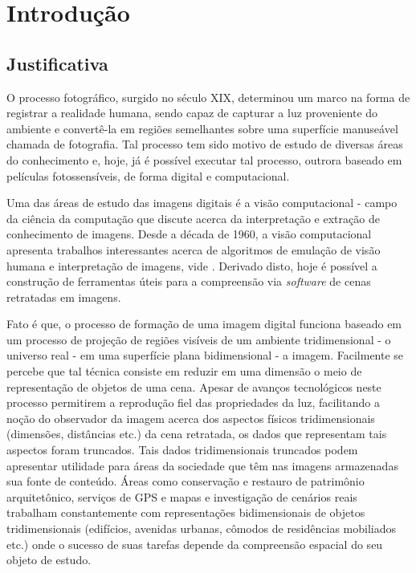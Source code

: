 \chapter{Introdução}
	\label{introducao}
	\setcounter{page}{1}

	\section{Justificativa}

	O processo fotográfico, surgido no século XIX, determinou um marco na forma de registrar a realidade humana, sendo capaz de capturar a luz proveniente do ambiente e convertê-la em regiões semelhantes sobre uma superfície manuseável chamada de fotografia. Tal processo tem sido motivo de estudo de diversas áreas do conhecimento e, hoje, já é possível executar tal processo, outrora baseado em películas fotossensíveis, de forma digital e computacional.
	
	Uma das áreas de estudo das imagens digitais é a visão computacional - campo da ciência da computação que discute acerca da interpretação e extração de conhecimento de imagens. Desde a década de 1960, a visão computacional apresenta trabalhos interessantes acerca de algoritmos de emulação de visão humana e interpretação de imagens, vide \cite{firstCVWork}. Derivado disto, hoje é possível a construção de ferramentas úteis para a compreensão via \textit{software} de cenas retratadas em imagens.
	
	Fato é que, o processo de formação de uma imagem digital funciona baseado em um processo de projeção de regiões visíveis de um ambiente tridimensional - o universo real - em uma superfície plana bidimensional - a imagem. Facilmente se percebe que tal técnica consiste em reduzir em uma dimensão o meio de representação de objetos de uma cena. Apesar de avanços tecnológicos neste processo permitirem a reprodução fiel das propriedades da luz, facilitando a noção do observador da imagem acerca  dos aspectos físicos tridimensionais (dimensões, distâncias etc.) da cena retratada, os dados que representam tais aspectos foram truncados. Tais dados tridimensionais truncados podem apresentar utilidade para áreas da sociedade que têm nas imagens armazenadas sua fonte de conteúdo. Áreas como conservação e restauro de patrimônio arquitetônico, serviços de GPS e mapas e investigação de cenários reais trabalham constantemente com representações bidimensionais de objetos tridimensionais (edifícios, avenidas urbanas, cômodos de residências mobiliados etc.) onde o sucesso de suas tarefas depende da compreensão espacial do seu objeto de estudo.
	
